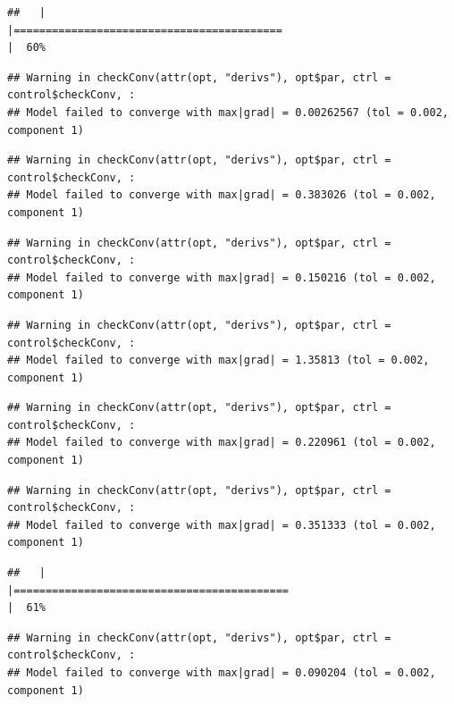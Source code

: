 \documentclass[
  12pt,
]{book}
\begin{document}
\begin{verbatim}
##   |                                                                              |==========================================                            |  60%
\end{verbatim}

\begin{verbatim}
## Warning in checkConv(attr(opt, "derivs"), opt$par, ctrl = control$checkConv, :
## Model failed to converge with max|grad| = 0.00262567 (tol = 0.002, component 1)
\end{verbatim}

\begin{verbatim}
## Warning in checkConv(attr(opt, "derivs"), opt$par, ctrl = control$checkConv, :
## Model failed to converge with max|grad| = 0.383026 (tol = 0.002, component 1)
\end{verbatim}

\begin{verbatim}
## Warning in checkConv(attr(opt, "derivs"), opt$par, ctrl = control$checkConv, :
## Model failed to converge with max|grad| = 0.150216 (tol = 0.002, component 1)
\end{verbatim}

\begin{verbatim}
## Warning in checkConv(attr(opt, "derivs"), opt$par, ctrl = control$checkConv, :
## Model failed to converge with max|grad| = 1.35813 (tol = 0.002, component 1)
\end{verbatim}

\begin{verbatim}
## Warning in checkConv(attr(opt, "derivs"), opt$par, ctrl = control$checkConv, :
## Model failed to converge with max|grad| = 0.220961 (tol = 0.002, component 1)
\end{verbatim}

\begin{verbatim}
## Warning in checkConv(attr(opt, "derivs"), opt$par, ctrl = control$checkConv, :
## Model failed to converge with max|grad| = 0.351333 (tol = 0.002, component 1)
\end{verbatim}

\begin{verbatim}
##   |                                                                              |===========================================                           |  61%
\end{verbatim}

\begin{verbatim}
## Warning in checkConv(attr(opt, "derivs"), opt$par, ctrl = control$checkConv, :
## Model failed to converge with max|grad| = 0.090204 (tol = 0.002, component 1)
\end{verbatim}
\end{document}
